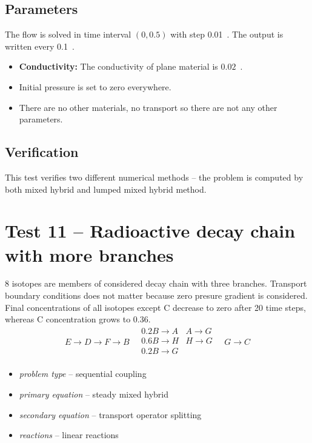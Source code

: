 \subsection*{Parameters}
The flow is solved in time interval $(0,0.5)$ with step 0.01~. The output is written every 0.1~.
\begin{itemize}
  \item \textbf{Conductivity:} The conductivity of plane material is $0.02$~.
  \item Initial pressure is set to zero everywhere.
  \item There are no other materials, no transport so there are not any other parameters.
\end{itemize}

\subsection*{Verification}
This test verifies two different numerical methods -- the problem is computed by both mixed hybrid and lumped mixed hybrid method.


\section{Test 11 -- Radioactive decay chain with more branches}
8 isotopes are members of considered decay chain with three branches. Transport boundary conditions does not matter 
because zero presure gradient is considered. Final concentrations of all isotopes except C decrease to zero after 20 
time steps, whereas C concentration grows to 0.36.
\[
 E\xrightarrow{}D\xrightarrow{}F\xrightarrow{}B
 \quad
 \begin{matrix}
    0.2B\xrightarrow{}A & A\xrightarrow{}G \\
    0.6B\xrightarrow{}H & H\xrightarrow{}G \\
    0.2B\xrightarrow{}G &\\
 \end{matrix}
 \quad
 G\xrightarrow{}C 
\]

\begin{itemize} 
    \item \emph{problem type} -- sequential coupling
    \item \emph{primary equation} -- steady mixed hybrid
    \item \emph{secondary equation} -- transport operator splitting
    \item \emph{reactions} -- linear reactions
  \end{itemize}


